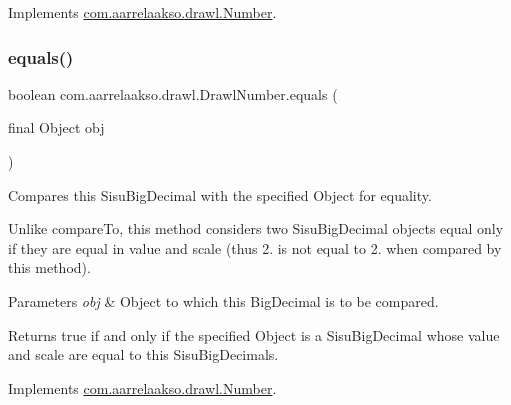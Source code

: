 Implements \hyperlink{interfacecom_1_1aarrelaakso_1_1drawl_1_1_number_a102dab4f981a76317b20d69d352ddb15}{com.\+aarrelaakso.\+drawl.\+Number}.

\mbox{\label{classcom_1_1aarrelaakso_1_1drawl_1_1_drawl_number_a54d65831347b02b14569ddfc021a4ade}} 
\subsubsection{\texorpdfstring{equals()}{equals()}\hspace{0.1cm}{\footnotesize\ttfamily [3/3]}}
{\footnotesize\ttfamily boolean com.\+aarrelaakso.\+drawl.\+Drawl\+Number.\+equals (\begin{DoxyParamCaption}\item[{final Object}]{obj }\end{DoxyParamCaption})}



Compares this Sisu\+Big\+Decimal with the specified Object for equality. 

Unlike compare\+To, this method considers two Sisu\+Big\+Decimal objects equal only if they are equal in value and scale (thus 2. is not equal to 2. when compared by this method).


\begin{DoxyParams}{Parameters}
{\em obj} & Object to which this Big\+Decimal is to be compared. \\
\hline
\end{DoxyParams}
\begin{DoxyReturn}{Returns}
true if and only if the specified Object is a Sisu\+Big\+Decimal whose value and scale are equal to this Sisu\+Big\+Decimal\textquotesingle{}s. 
\end{DoxyReturn}


Implements \hyperlink{interfacecom_1_1aarrelaakso_1_1drawl_1_1_number_a9cf883b0a5979a9f0420cca2c2ff9d89}{com.\+aarrelaakso.\+drawl.\+Number}.

\mbox{\label{classcom_1_1aarrelaakso_1_1drawl_1_1_drawl_number_ae8442cbd5cc7ab0c35c0302b196b3819}} 
